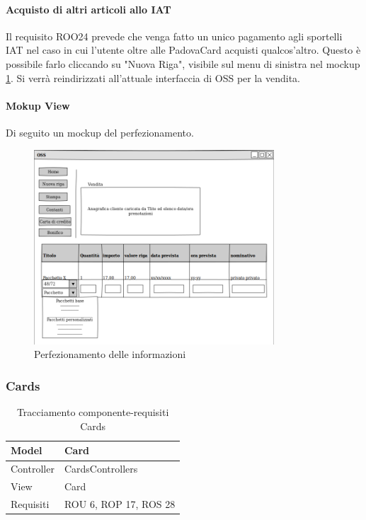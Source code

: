 \paragraph{Acquisto di altri articoli allo IAT} 

Il requisito ROO24 prevede che venga fatto un unico pagamento agli sportelli IAT nel caso in cui l'utente oltre alle PadovaCard acquisti qualcos'altro. Questo è possibile farlo cliccando su "Nuova Riga", visibile sul menu di sinistra nel mockup \ref{perfezionamentoinfo}. Si verrà reindirizzati all'attuale interfaccia di OSS per la vendita.


\paragraph{Mokup View}
Di seguito un mockup del perfezionamento.

\begin{figure}[H] \label{mockupperfezionamento}
\centering
\includegraphics[width=0.8\textwidth]{images/mockup_perfezionamento_info.png}
\caption{Perfezionamento delle informazioni\label{perfezionamentoinfo}}
\end{figure}


\subsubsection{Cards}
\def\arraystretch{2}
\begin{table}[H]
\centering
\begin{tabular}{|l|l|}
\hline
Model & Card \\ \hline
Controller & CardsControllers \\ \hline
View & Card \\ \hline
Requisiti & ROU 6, ROP 17, ROS 28 \\ \hline
\end{tabular}
\caption{Tracciamento componente-requisiti Cards}
\end{table}

